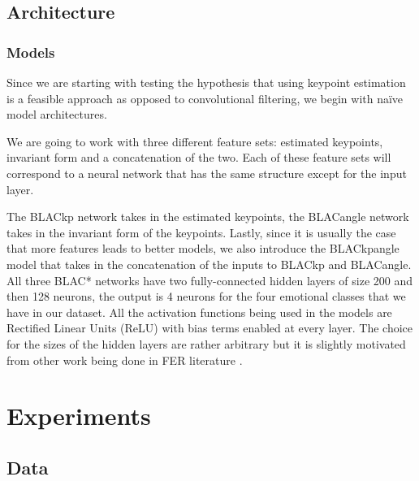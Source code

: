 \documentclass{article}
\begin{document}
\subsection{Architecture}

\subsubsection{Models}

Since we are starting with testing the hypothesis that using keypoint estimation is a feasible approach as opposed to convolutional filtering, we begin with na\"ive model architectures.

We are going to work with three different feature sets: estimated keypoints, invariant form and a concatenation of the two. Each of these feature sets will correspond to a neural network that has the same structure except for the input layer. 

The BLACkp network takes in the estimated keypoints, the BLACangle network takes in the invariant form of the keypoints. Lastly, since it is usually the case that more features leads to better models, we also introduce the BLACkpangle model that takes in the concatenation of the inputs to BLACkp and BLACangle. All three BLAC* networks have two fully-connected hidden layers of size 200 and then 128 neurons, the output is 4 neurons for the four emotional classes that we have in our dataset. All the activation functions being used in the models are Rectified Linear Units (ReLU) with bias terms enabled at every layer. The choice for the sizes of the hidden layers are rather arbitrary but it is slightly motivated from other work being done in FER literature \citep{dachapally2017facial}.


\section{Experiments}

\subsection{Data}
\end{document}
